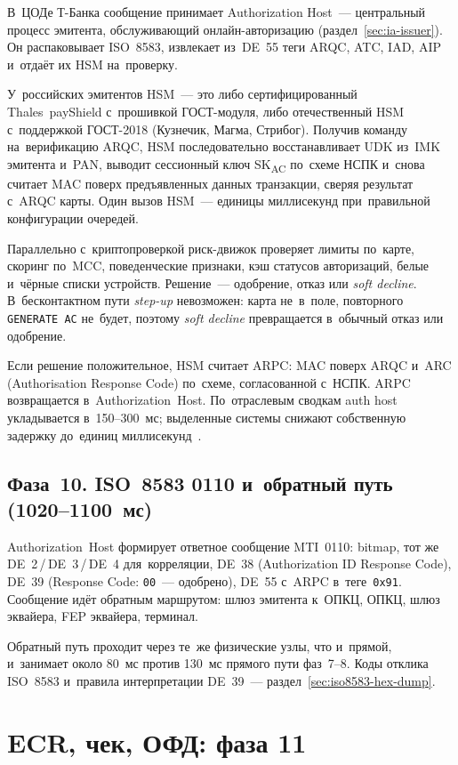 В~ЦОДе Т-Банка сообщение принимает Authorization Host~--- центральный процесс
эмитента, обслуживающий онлайн-авторизацию (раздел~\ref{sec:ia-issuer}).
Он распаковывает ISO~8583, извлекает из~DE~55 теги ARQC, ATC, IAD, AIP и~отдаёт
их HSM на~проверку.

У~российских эмитентов HSM~--- это либо сертифицированный Thales~payShield
с~прошивкой ГОСТ-модуля, либо отечественный HSM с~поддержкой ГОСТ-2018
(Кузнечик, Магма, Стрибог). Получив команду на~верификацию ARQC,
HSM последовательно восстанавливает UDK из~IMK эмитента и~PAN, выводит
сессионный ключ SK\textsubscript{AC} по~схеме НСПК и~снова считает MAC поверх
предъявленных данных транзакции, сверяя результат с~ARQC карты. Один вызов HSM~---
единицы миллисекунд при~правильной конфигурации очередей.

Параллельно с~криптопроверкой риск-движок проверяет лимиты по~карте, скоринг
по~MCC, поведенческие признаки, кэш статусов авторизаций, белые и~чёрные списки
устройств.
Решение~--- одобрение, отказ или \textit{soft decline}. В~бесконтактном
пути \textit{step-up} невозможен: карта не~в~поле, повторного \texttt{GENERATE~AC}
не~будет, поэтому \textit{soft decline} превращается в~обычный отказ или одобрение.

Если решение положительное, HSM считает ARPC: MAC поверх ARQC и~ARC
(Authorisation Response Code) по~схеме, согласованной с~НСПК. ARPC возвращается
в~Authorization~Host. По~отраслевым сводкам auth host укладывается в~150--300~мс;
выделенные системы снижают собственную задержку до~единиц миллисекунд~\cite{qonto-card-auth}.

\subsection*{Фаза~10. ISO~8583 0110 и~обратный путь (1020--1100~мс)}

Authorization~Host формирует ответное сообщение MTI~0110: bitmap, тот же
DE~2\,/\,DE~3\,/\,DE~4 для~корреляции, DE~38 (Authorization ID Response Code),
DE~39 (Response Code: \texttt{00}~--- одобрено), DE~55 с~ARPC в~теге~\texttt{0x91}.
Сообщение идёт обратным маршрутом: шлюз эмитента к~ОПКЦ, ОПКЦ, шлюз
эквайера, FEP эквайера, терминал.

Обратный путь проходит через те~же физические узлы, что и~прямой, и~занимает
около 80~мс против 130~мс прямого пути фаз~7--8. Коды отклика ISO~8583 и~правила интерпретации
DE~39~--- раздел~\ref{sec:iso8583-hex-dump}.

\section{ECR, чек, ОФД: фаза 11}\label{sec:one-tap-ecr}

